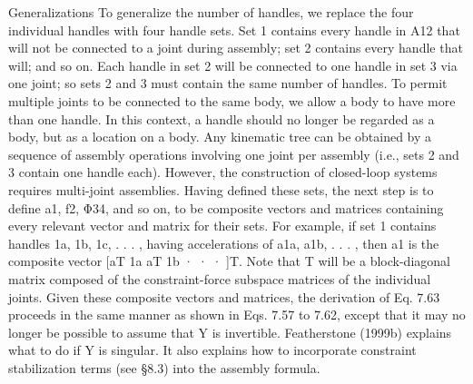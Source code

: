 Generalizations To generalize the number of handles, we replace the four individual handles with four handle sets. Set 1 contains every handle in A12 that will not be connected to a joint during assembly; set 2 contains every handle that will; and so on. Each handle in set 2 will be connected to one handle in set 3 via one joint; so sets 2 and 3 must contain the same number of handles. To permit multiple joints to be connected to the same body, we allow a body to have more than one handle. In this context, a handle should no longer be regarded as a body, but as a location on a body. Any kinematic tree can be obtained by a sequence of assembly operations involving one joint per assembly (i.e., sets 2 and 3 contain one handle each). However, the construction of closed-loop systems requires multi-joint assemblies. Having defined these sets, the next step is to define a1, f2, Φ34, and so on, to be composite vectors and matrices containing every relevant vector and matrix for their sets. For example, if set 1 contains handles 1a, 1b, 1c, . . . , having accelerations of a1a, a1b, . . . , then a1 is the composite vector [aT 1a aT 1b · · · ]T. Note that T will be a block-diagonal matrix composed of the constraint-force subspace matrices of the individual joints. Given these composite vectors and matrices, the derivation of Eq. 7.63 proceeds in the same manner as shown in Eqs. 7.57 to 7.62, except that it may no longer be possible to assume that Y is invertible. Featherstone (1999b) explains what to do if Y is singular. It also explains how to incorporate constraint stabilization terms (see §8.3) into the assembly formula.
